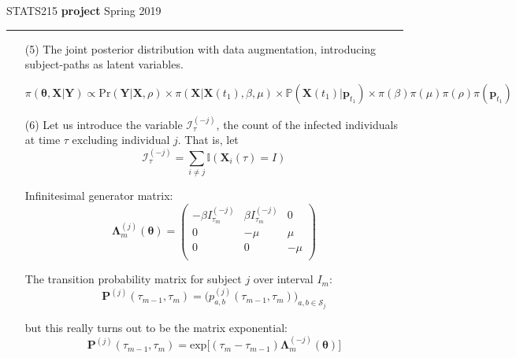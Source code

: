 \documentclass[12pt]{article}
\newcommand{\p}{ \mathbb{P} }
\begin{document}
\noindent
STATS215 \hfill \textbf{project} \newline 
{Spring 2019} \hfill 

\noindent
\rule{\linewidth}{0.4pt}

\vspace{.4cm}
\begin{enumerate}
    \item [(5)]
    The joint posterior distribution with data augmentation, introducing subject-paths as latent variables. 

    \begin{equation}
        \pi(\mathbf{\theta}, \mathbf{X} | \mathbf{Y}) \propto \text{Pr}(\mathbf{Y} | \mathbf{X}, \rho) \times \pi (\mathbf{X} | \mathbf{X} (t_1), \beta, \mu) \times \p(\mathbf{X}(t_1) | \mathbf{p}_{t_1} ) \times \pi(\beta) \pi(\mu) \pi(\rho) \pi(\mathbf{p}_{t_1})
    \end{equation}

    \item [(6)]
    Let us introduce the variable $\mathcal{I}_\tau ^{(-j)}$, the count of the infected individuals at time $\tau$ excluding individual $j$. That is, let \[ \mathcal{I}_\tau ^{(-j)} = \sum_{i \neq j} \mathbb{I} (\mathbf{X}_i (\tau ) = I)\]

    Infinitesimal generator matrix: 
    \begin{equation}   
        \mathbf{\Lambda}_m^{(j)} (\mathbf{\theta}) = \begin{pmatrix}
            -\beta I_{\tau_{m}} ^{(-j)}  & \beta  I_{\tau_{m}} ^{(-j)} & 0 \\ 
            0 & -\mu & \mu \\ 
            0 & 0 & -\mu \\
        \end{pmatrix}
    \end{equation}

    The transition probability matrix for subject $j$ over interval $I_m$: \[ \textbf{P}^{(j)} (\tau_{m - 1}, \tau_{m}) = \big( p_{a,b}^{(j)} (\tau_{m-1}, \tau_m) \big)_{a, b \in \mathcal{S}_j}\]

    but this really turns out to be the matrix exponential: \[ \textbf{P}^{(j)} (\tau_{m - 1}, \tau_{m}) = \text{exp} \big[ (\tau_m - \tau_{m-1}) \mathbf{\Lambda}_m^{(-j)} (\mathbf{\theta}) \big]\]


\end{enumerate}
\end{document}
